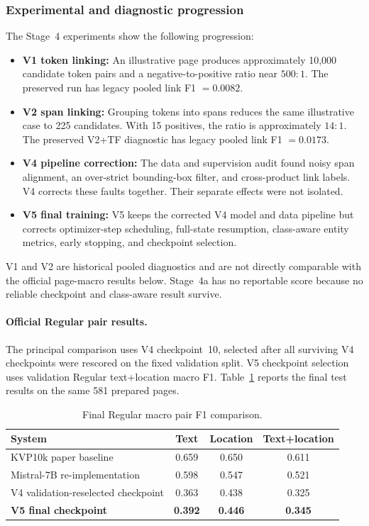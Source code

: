 \documentclass[11pt,a4paper]{article}
\begin{document}
\subsubsection*{Experimental and diagnostic progression}

The Stage~4 experiments show the following progression:
\begin{itemize}[nosep]
  \item \textbf{V1 token linking:} An illustrative page produces approximately
  10{,}000 candidate token pairs and a negative-to-positive ratio near
  $500{:}1$. The preserved run has legacy pooled link F1 $=0.0082$.
  \item \textbf{V2 span linking:} Grouping tokens into spans reduces the same
  illustrative case to 225 candidates. With 15 positives, the ratio is
  approximately $14{:}1$. The preserved V2+TF diagnostic has legacy pooled
  link F1 $=0.0173$.
  \item \textbf{V4 pipeline correction:} The data and supervision audit found
  noisy span alignment, an over-strict bounding-box filter, and cross-product
  link labels. V4 corrects these faults together. Their separate effects were
  not isolated.
  \item \textbf{V5 final training:} V5 keeps the corrected V4 model and data
  pipeline but corrects optimizer-step scheduling, full-state resumption,
  class-aware entity metrics, early stopping, and checkpoint selection.
\end{itemize}

V1 and V2 are historical pooled diagnostics and are not directly comparable
with the official page-macro results below. Stage~4a has no reportable score
because no reliable checkpoint and class-aware result survive.

\paragraph{Official Regular pair results.}
The principal comparison uses V4 checkpoint~10, selected after all surviving V4
checkpoints were rescored on the fixed validation split. V5 checkpoint selection
uses validation Regular text+location macro F1. Table~\ref{tab:pr-final-regular}
reports the final test results on the same 581 prepared pages.

\begin{table}[H]
  \centering
  \caption{Final Regular macro pair F1 comparison.}
  \label{tab:pr-final-regular}
  \begin{tabular}{lccc}
    \toprule
    \textbf{System} & \textbf{Text} & \textbf{Location} & \textbf{Text+location} \\
    \midrule
    KVP10k paper baseline & 0.659 & 0.650 & 0.611 \\
    Mistral-7B re-implementation & 0.598 & 0.547 & 0.521 \\
    V4 validation-reselected checkpoint & 0.363 & 0.438 & 0.325 \\
    \textbf{V5 final checkpoint} & \textbf{0.392} & \textbf{0.446} & \textbf{0.345} \\
    \bottomrule
  \end{tabular}
\end{table}
\end{document}
